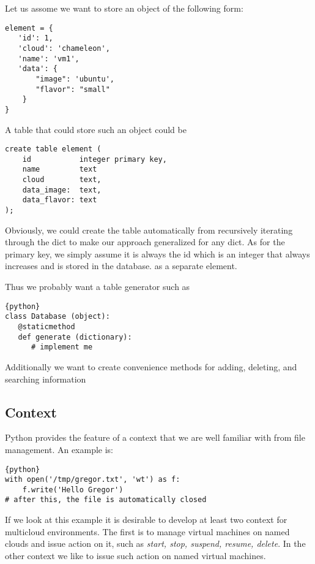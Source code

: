 Let us assome we want to store an object of the following form:

\begin{verbatim}
element = {
   'id': 1,
   'cloud': 'chameleon',
   'name': 'vm1',
   'data': {
       "image": 'ubuntu',
       "flavor": "small"
    }
}
\end{verbatim}

A table that could store such an object could be

\begin{verbatim}
create table element (
    id           integer primary key,
    name         text
    cloud        text,
    data_image:  text,
    data_flavor: text
);
\end{verbatim}

Obviously, we could create the table automatically from recursively
iterating through the dict to make our approach generalized for any
dict. As for the primary key, we simply assume it is always the id
which is an integer that always increases and is stored in the database.
as a separate element.

Thus we probably want a table generator such as

\begin{lstlisting}{python}
class Database (object):
   @staticmethod
   def generate (dictionary):
      # implement me
\end{lstlisting}

Additionally we want to create convenience methods for adding,
deleting, and searching information


\subsection{Context}

Python provides the feature of a context that we are well familiar
with from file management. An example is:

\begin{lstlisting}{python}
with open('/tmp/gregor.txt', 'wt') as f:
    f.write('Hello Gregor')
# after this, the file is automatically closed
\end{lstlisting}

If we look at this example it is desirable to develop at least two
context for multicloud environments. The first is to manage virtual
machines on named clouds and issue action on it, such as \textit{start, stop,
  suspend, resume, delete}. In the other context we like to issue
such action on named virtual machines.

